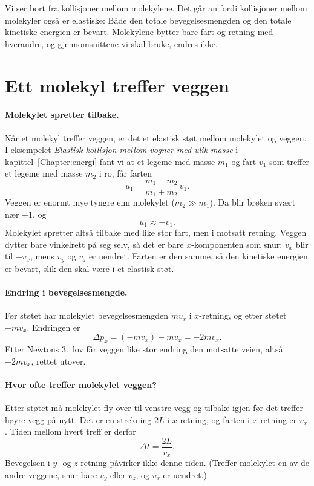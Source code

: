 \documentclass[../Main.tex]{subfiles}
\begin{document}
Vi ser bort fra kollisjoner mellom molekylene. Det går an fordi kollisjoner mellom molekyler også er elastiske: Både den totale bevegelsesmengden og den totale kinetiske energien er bevart. Molekylene bytter bare fart og retning med hverandre, og gjennomsnittene vi skal bruke, endres ikke.

\section{Ett molekyl treffer veggen}

\paragraph{Molekylet spretter tilbake.} Når et molekyl treffer veggen, er det et elastisk støt mellom molekylet og veggen. I eksempelet \emph{Elastisk kollisjon mellom vogner med ulik masse} i kapittel~\ref{Chapter:energi} fant vi at et legeme med masse $m_1$ og fart $v_1$ som treffer et legeme med masse $m_2$ i ro, får farten
\[
  u_1 = \frac{m_1 - m_2}{m_1 + m_2}\,v_1 .
\]
Veggen er enormt mye tyngre enn molekylet ($m_2 \gg m_1$). Da blir brøken svært nær $-1$, og
\[
  u_1 \approx -v_1 .
\]
Molekylet spretter altså tilbake med like stor fart, men i motsatt retning. Veggen dytter bare vinkelrett på seg selv, så det er bare $x$-komponenten som snur: $v_x$ blir til $-v_x$, mens $v_y$ og $v_z$ er uendret. Farten er den samme, så den kinetiske energien er bevart, slik den skal være i et elastisk støt.

\paragraph{Endring i bevegelsesmengde.} Før støtet har molekylet bevegelsesmengden $mv_x$ i $x$-retning, og etter støtet $-mv_x$. Endringen er
\[
  \Delta p_x = (-mv_x) - mv_x = -2mv_x .
\]
Etter Newtons 3.\ lov får veggen like stor endring den motsatte veien, altså $+2mv_x$, rettet utover.

\paragraph{Hvor ofte treffer molekylet veggen?} Etter støtet må molekylet fly over til venstre vegg og tilbake igjen før det treffer høyre vegg på nytt. Det er en strekning $2L$ i $x$-retning, og farten i $x$-retning er $v_x$. Tiden mellom hvert treff er derfor
\[
  \Delta t = \frac{2L}{v_x} .
\]
Bevegelsen i $y$- og $z$-retning påvirker ikke denne tiden. (Treffer molekylet en av de andre veggene, snur bare $v_y$ eller $v_z$, og $v_x$ er uendret.)
\end{document}
